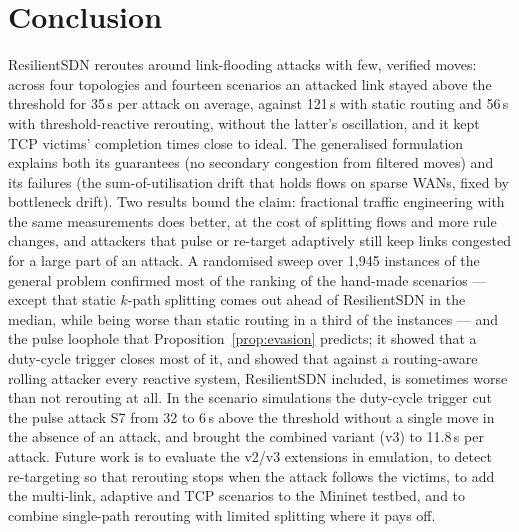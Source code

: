 \section{Conclusion}
ResilientSDN reroutes around link-flooding attacks with few, verified moves: across four topologies
and fourteen scenarios an attacked link stayed above the threshold for 35\,s per attack on average,
against 121\,s with static routing and 56\,s with threshold-reactive rerouting, without the latter's
oscillation, and it kept TCP victims' completion times close to ideal. The generalised formulation explains both its guarantees (no secondary congestion
from filtered moves) and its failures (the sum-of-utilisation drift that holds flows on sparse WANs,
fixed by bottleneck drift). Two results bound the claim: fractional traffic engineering with the same
measurements does better, at the cost of splitting flows and more rule changes, and attackers that pulse
or re-target adaptively still keep links congested for a large part of an attack. A randomised sweep
over 1{,}945 instances of the general problem confirmed most of the ranking of the hand-made scenarios
--- except that static $k$-path splitting comes out ahead of ResilientSDN in the median, while being
worse than static routing in a third of the instances --- and the pulse loophole that
Proposition~\ref{prop:evasion} predicts; it showed that a duty-cycle trigger closes
most of it, and showed that against a routing-aware rolling attacker every reactive system,
ResilientSDN included, is sometimes worse than not rerouting at all. In the scenario simulations the
duty-cycle trigger cut the pulse attack S7 from 32 to 6\,s above the threshold without a single move
in the absence of an attack, and brought the combined variant (v3) to 11.8\,s per attack. Future work
is to evaluate the v2/v3 extensions in emulation, to detect re-targeting so that rerouting stops when
the attack follows the victims, to add the multi-link, adaptive and TCP scenarios to the Mininet
testbed, and to combine single-path rerouting with limited splitting where it pays off.
